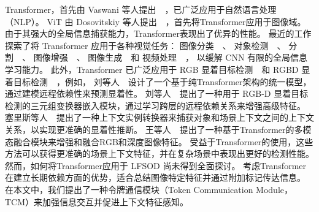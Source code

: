 Transformer，首先由 Vaswani 等人提出~\cite{vaswani2017attention}~，已广泛应用于自然语言处理（NLP）。
ViT 由 Dosovitskiy 等人提出~\cite{dosovitskiy2020image}~，首先将Transformer应用于图像域。 由于其强大的全局信息捕获能力，Transformer表现出了优异的性能。
最近的工作探索了将 Transformer 应用于各种视觉任务：
图像分类~\cite{chen2020generative, dosovitskiy2020image}~、
对象检测~\cite{zhu2020deformable, dai2021up, sun2021rethinking}~、
分割~\cite{chen2021pre, wang2021end}~、
图像增强~\cite{yang2020learning, chen2021pre}~、
图像生成~\cite{parmar2018image}~和 
视频处理~\cite{zhou2018end, zheng2020end}~，
以缓解 CNN 有限的全局信息学习能力。 此外，Transformer 已广泛应用于 RGB 显着目标检测~\cite{liu2021visual, siris2021scene}~和 RGBD 显着目标检测~\cite{liu2021tritransnet, wang2021mutualformer}~，例如，
刘等人~\cite{liu2021visual}~设计了一个基于纯Transformer架构的统一模型，通过建模远程依赖性来预测显着性。 
刘等人~\cite{liu2021tritransnet}~提出了一种用于 RGB-D 显着目标检测的三元组变换器嵌入模块，通过学习跨层的远程依赖关系来增强高级特征。 
塞里斯等人~\cite{siris2021scene}~提出了一种上下文实例转换器来捕获对象和场景上下文之间的上下文关系，以实现更准确的显着性推断。 
王等人~\cite{wang2021mutualformer}~提出了一种基于Transformer的多模态融合模块来增强和融合RGB和深度图像特征。
受益于Transformer的使用，这些方法可以获得更准确的场景上下文特征，并在复杂场景中表现出更好的检测性能。 然而，如何将Transformer应用于 LFSOD 尚未得到全面探讨。 考虑Transformer在建立长期依赖方面的优势，适合总结图像特定特征并通过附加标记传达信息。 在本文中，我们提出了一种令牌通信模块（Token Communication
Module，TCM）来加强信息交互并促进上下文特征感知。









